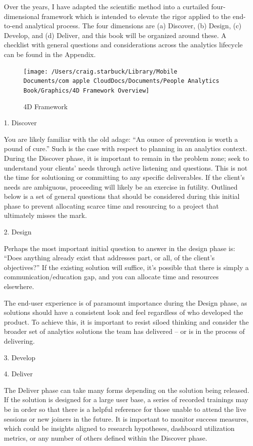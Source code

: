 \documentclass[]{book}
\begin{document}
Over the years, I have adapted the scientific method into a curtailed four-dimensional framework which is intended to elevate the rigor applied to the end-to-end analytical process. The four dimensions are (a) Discover, (b) Design, (c) Develop, and (d) Deliver, and this book will be organized around these. A checklist with general questions and considerations across the analytics lifecycle can be found in the Appendix.

\begin{figure}
\texttt{[image: /Users/craig.starbuck/Library/Mobile Documents/com~apple~CloudDocs/Documents/People Analytics Book/Graphics/4D Framework Overview]} \caption{4D Framework}\label{fig:unnamed-chunk-3}
\end{figure}

1. Discover

You are likely familiar with the old adage: ``An ounce of prevention is worth a pound of cure.'' Such is the case with respect to planning in an analytics context. During the Discover phase, it is important to remain in the problem zone; seek to understand your clients' needs through active listening and questions. This is not the time for solutioning or committing to any specific deliverables. If the client's needs are ambiguous, proceeding will likely be an exercise in futility. Outlined below is a set of general questions that should be considered during this initial phase to prevent allocating scarce time and resourcing to a project that ultimately misses the mark.

2. Design

Perhaps the most important initial question to answer in the design phase is: ``Does anything already exist that addresses part, or all, of the client's objectives?'' If the existing solution will suffice, it's possible that there is simply a communication/education gap, and you can allocate time and resources elsewhere.

The end-user experience is of paramount importance during the Design phase, as solutions should have a consistent look and feel regardless of who developed the product. To achieve this, it is important to resist siloed thinking and consider the broader set of analytics solutions the team has delivered -- or is in the process of delivering.

3. Develop

4. Deliver

The Deliver phase can take many forms depending on the solution being released. If the solution is designed for a large user base, a series of recorded trainings may be in order so that there is a helpful reference for those unable to attend the live sessions or new joiners in the future. It is important to monitor success measures, which could be insights aligned to research hypotheses, dashboard utilization metrics, or any number of others defined within the Discover phase.
\end{document}
